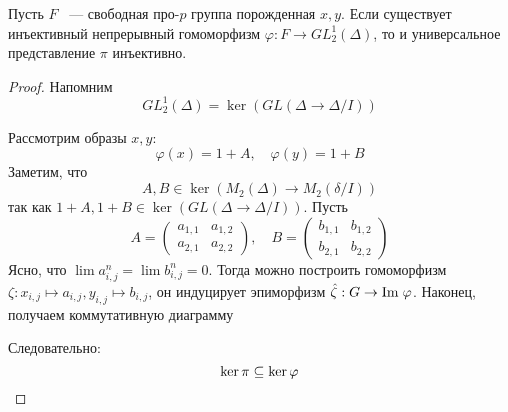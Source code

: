 \vskip 0.1in\noindent
\begin{theorem}[Зубков, 1987]
    Пусть $F$ ~--- свободная про-$p$ группа порожденная $x, y$.
    Если существует инъективный непрерывный гомоморфизм $\varphi: F \to GL^1_2(\Delta)$, то и универсальное представление $\pi$ инъективно.
\end{theorem}
\begin{proof}
    Напомним
    \[
        GL^1_2(\Delta) = \ker{(GL(\Delta \to \Delta / I))}
    \]

    Рассмотрим образы $x, y$:
    \[
        \varphi(x) = 1 + A, \quad
        \varphi(y) = 1 + B
    \]
    Заметим, что
    \[
        A, B \in \ker{(M_2(\Delta)\to M_2(\delta/I))}
    \]
    так как $1 + A, 1 + B \in \ker{(GL(\Delta \to \Delta / I))}$.
    Пусть
    \[
        A=
        \begin{pmatrix}
            a_{1,1} & a_{1,2} \\
            a_{2,1} & a_{2,2}
        \end{pmatrix},
        \quad
        B=
        \begin{pmatrix}
            b_{1,1} & b_{1,2} \\
            b_{2,1} & b_{2,2}
        \end{pmatrix}
    \]
    Ясно, что $\lim a_{i,j}^n = \lim b_{i,j}^n = 0$.
    Тогда можно построить гомоморфизм $\zeta: x_{i,j} \mapsto a_{i,j}, y_{i,j} \mapsto b_{i,j}$, он индуцирует эпиморфизм
    $\hat{\zeta}: G \to \mathrm{Im}\hspace{0.1cm}{\varphi}$.
    Наконец, получаем коммутативную диаграмму
    \begin{center}
    \end{center}
    Следовательно:
    \[
        \ker{\pi} \subseteq \ker{\varphi} \qedhere
    \]

\end{proof}


